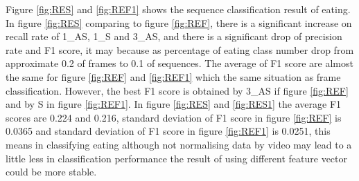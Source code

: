 \newline
Figure \ref{fig:RES} and \ref{fig:REF1} shows the sequence classification result of eating. In figure \ref{fig:RES} comparing to figure \ref{fig:REF}, there is a significant increase on recall rate of 1\_AS, 1\_S and 3\_AS, and there is a significant drop of precision rate and F1 score, it may because as percentage of eating class number drop from approximate 0.2 of frames to 0.1 of sequences.  The average of F1 score are almost the same for figure \ref{fig:REF} and \ref{fig:REF1} which the same situation as frame classification. However, the best F1 score is obtained by 3\_AS if figure \ref{fig:REF} and by S in figure \ref{fig:REF1}. In figure \ref{fig:RES} and \ref{fig:RES1} the average F1 scores are 0.224 and 0.216, standard deviation of F1 score in figure \ref{fig:REF} is 0.0365 and standard deviation of F1 score in figure \ref{fig:REF1} is 0.0251, this means in classifying eating although not normalising data by video may lead to a little less in classification performance the result of using different feature vector could be more stable.
